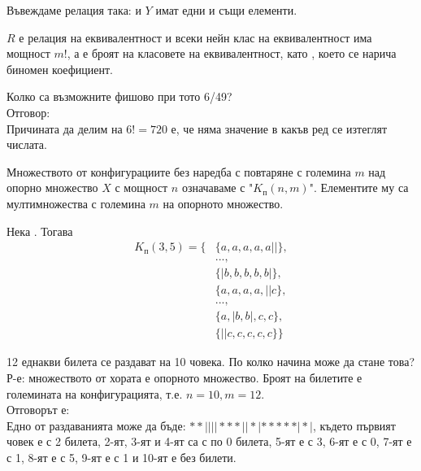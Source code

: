 Въвеждаме релация  така:
 и \(Y\) имат едни и същи елементи.

\(R\) е релация на еквивалентност и всеки нейн клас на еквивалентност има мощност \(m!\), а 
 е броят на класовете на еквивалентност, като
, което се нарича биномен коефициент.

\begin{example}
    Колко са възможните фишово при тото 6/49? \\
    Отговор:  \\
    Причината да делим на \(6! = 720\) е, че няма значение в какъв ред се изтеглят числата.
\end{example}

\begin{definition}
    Множеството от конфигурациите без наредба с повтаряне с големина \(m\) 
    над опорно множество \(X\) с мощност \(n\) означаваме с "\(K_\text{п}(n, m)\)". Елементите му са 
    мултимножества с големина \(m\) на опорното множество.
\end{definition}

\begin{example}
    Нека . Тогава
    \begin{align*}
        K_\text{п}(3, 5) = \{&\{a, a, a, a, a||\}, \\
                            &..., \\
                            &\{|b, b, b, b, b|\}, \\
                            &\{a, a, a, a, ||c\}, \\
                            &..., \\
                            &\{a, |b, b|, c, c\}, \\
                            &\{||c, c, c, c, c\}\}
    \end{align*}
\end{example}

\begin{example}
    12 еднакви билета се раздават на 10 човека. По колко начина може да стане това? \\
    Р-е: множеството от хората е опорното множество. Броят на билетите е големината на конфигурацията, т.е.
    \(n = 10, m = 12\). \\
    Отговорът е:  \\
    Едно от раздаванията може да бъде: \(**||||***||*|*****|*|\), където първият човек е с 2 билета, 
    2-ят, 3-ят и 4-ят са с по 0 билета, 5-ят е с 3, 6-ят е с 0, 7-ят е с 1, 8-ят е с 5, 9-ят е с 1 и 
    10-ят е без билети.
\end{example}


